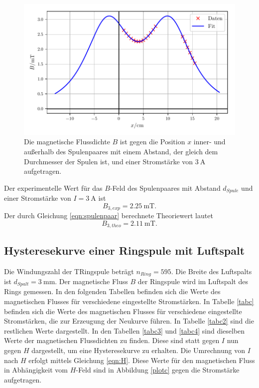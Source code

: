\begin{figure}
    \centering
    \includegraphics{build/plotb3.pdf}
    \caption{Die magnetische Flussdichte $B$ ist gegen die Position $x$ inner-
    und außerhalb des Spulenpaares mit einem Abstand, der gleich dem Durchmesser
    der Spulen ist, und einer Stromstärke von $\SI{3}{\ampere}$ aufgetragen.}
    \label{plotb3}
\end{figure}

\noindent Der experimentelle Wert für das $B$-Feld des Spulenpaares
mit Abstand $d_{Spule}$ und einer Stromstärke von $I = \SI{3}{\ampere}$
ist
\begin{equation*}
   B_{3,exp} = \SI{2.25}{\milli\tesla}.
\end{equation*}
Der durch Gleichung \eqref{eqn:spulenpaar} berechnete Theoriewert
lautet
\begin{equation*}
   B_{3,theo} = \SI{2.11}{\milli\tesla}.
\end{equation*}

\subsection{Hysteresekurve einer Ringspule mit Luftspalt}
Die Windungszahl der TRingspule beträgt $n_{Ring} = \num{595}$.
Die Breite des Luftspalts ist $d_{Spalt} = \SI{3}{\milli\meter}$.
\newline
Der magnetische Fluss $B$ der Ringspule wird im Luftspalt
des Rings gemessen.
In den folgenden Tabellen befinden sich die Werte des magnetischen
Flusses für verschiedene eingestellte Stromstärken.
In Tabelle \ref{tabc} befinden sich die Werte des magnetischen Flusses
für verschiedene eingestellte Stromstärken, die zur Erzeugung der Neukurve
führen. In Tabelle \ref{tabc2} sind die restlichen Werte dargestellt.
\newline
In den Tabellen \ref{tabc3} und \ref{tabc4} sind dieselben Werte der
magnetischen Flussdichten zu finden. Diese sind statt gegen $I$ nun
gegen $H$ dargestellt, um eine Hysteresekurve zu erhalten.
Die Umrechnung von $I$ nach $H$ erfolgt mittels Gleichung \eqref{eqn:H}.
\newline
Diese Werte für den magnetischen Fluss in Abhängigkeit vom
$H$-Feld sind in Abbildung \ref{plotc} gegen die Stromstärke aufgetragen.





